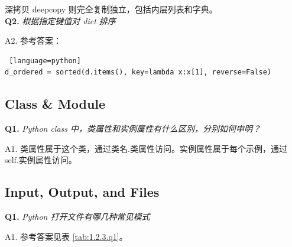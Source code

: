 \documentclass[cn,10pt,math=newtx,citestyle=gb7714-2015,bibstyle=gb7714-2015]{elegantbook}
\begin{document}
深拷贝 deepcopy 则完全复制独立，包括内层列表和字典。\\


\textbf{Q2.} \textit{根据指定键值对 dict 排序}

A2. 参考答案：

\begin{lstlisting} [language=python]
d_ordered = sorted(d.items(), key=lambda x:x[1], reverse=False)
\end{lstlisting}


\subsection{Class \& Module}

\textbf{Q1.} \textit{Python class 中，类属性和实例属性有什么区别，分别如何申明？}

A1. 类属性属于这个类，通过类名.类属性访问。实例属性属于每个示例，通过 self.实例属性访问。


\subsection{Input, Output, and Files}

\textbf{Q1.} \textit{Python 打开文件有哪几种常见模式}

A1. 参考答案见表 \ref{tab:1.2.3.q1}。
\end{document}
